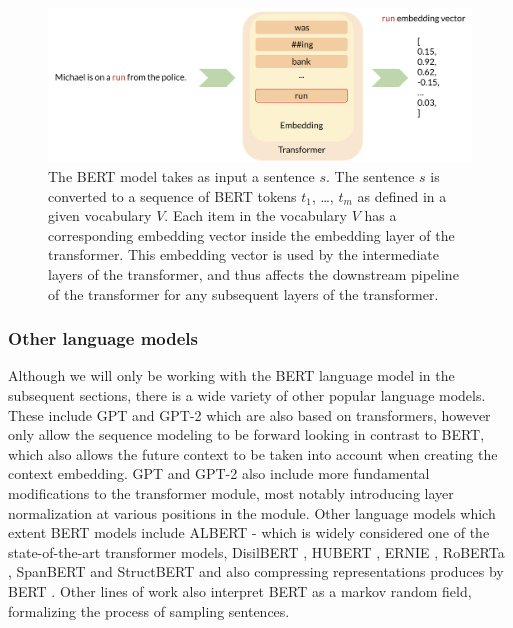 \documentclass[a4paper,12pt,twoside,openright]{report}
\begin{document}
\begin{figure}[h]
	\center
  \includegraphics[width=\linewidth]{./assets/experiments/pipeline_vanilla_BERT.png}
  \caption{The BERT model takes as input a sentence $s$. The sentence $s$ is converted to a sequence of BERT tokens $t_1$, \ldots, $t_m$ as defined in a given vocabulary $V$.
Each item in the vocabulary $V$ has a corresponding embedding vector inside the embedding layer of the transformer.
This embedding vector is used by the intermediate layers of the transformer, and thus affects the downstream pipeline of the transformer for any subsequent layers of the transformer.
}
  \label{fig:BERT_vanilla_pipeline}
\end{figure}


\subsubsection{Other language models}

Although we will only be working with the BERT language model in the subsequent sections, there is a wide variety of other popular language models.
These include GPT \cite{radford18} and GPT-2 \cite{radford19} which are also based on transformers, however only allow the sequence modeling to be forward looking in contrast to BERT, which also allows the future context to be taken into account when creating the context embedding.
GPT and GPT-2 also include more fundamental modifications to the transformer module, most notably introducing layer normalization \cite{ba16} at various positions in the module. 
Other language models which extent BERT models include ALBERT \cite{lan20} - which is widely considered one of the state-of-the-art transformer models, DisilBERT \cite{sanh19}, HUBERT \cite{moradshahi19}, ERNIE \cite{sun19}, RoBERTa \cite{liu19}, SpanBERT \cite{joshi19} and StructBERT \cite{wang19d} and also compressing representations produces by BERT \cite{shen19}.
Other lines of work \cite{wang19e} also interpret BERT as a markov random field, formalizing the process of sampling sentences.
\end{document}

